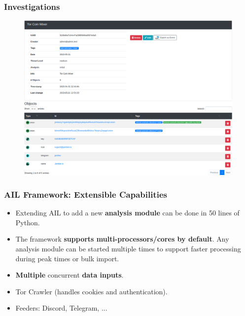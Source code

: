 \documentclass{beamer}
\begin{document}
\begin{frame}
    \frametitle{Investigations}
    \begin{figure}
        \includegraphics[scale=0.22, angle=0]{screenshot/investigation_mixer.png}
    \end{figure}
\end{frame}

\begin{frame}
    \frametitle{AIL Framework: Extensible Capabilities}
    \begin{itemize}
        \item Extending AIL to add a new \textbf{analysis module} can be done in 50 lines of Python.
        \item The framework \textbf{supports multi-processors/cores by default}. Any analysis module can be started multiple times to support faster processing during peak times or bulk import.
        \item \textbf{Multiple} concurrent \textbf{data inputs}.
        \item Tor Crawler (handles cookies and authentication).
        \item Feeders: Discord, Telegram, ...
    \end{itemize}
\end{frame}
\end{document}
